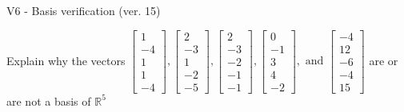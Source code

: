 \begin{exercise}
  \begin{exerciseTitle}V6 - Basis verification (ver. 15)\end{exerciseTitle}
  \begin{exerciseStatement}
    Explain why the vectors \(\left[\begin{array}{r}
1 \\
-4 \\
1 \\
1 \\
-4
\end{array}\right] , \left[\begin{array}{r}
2 \\
-3 \\
1 \\
-2 \\
-5
\end{array}\right] , \left[\begin{array}{r}
2 \\
-3 \\
-2 \\
-1 \\
-1
\end{array}\right] , \left[\begin{array}{r}
0 \\
-1 \\
3 \\
4 \\
-2
\end{array}\right] , \text{ and } \left[\begin{array}{r}
-4 \\
12 \\
-6 \\
-4 \\
15
\end{array}\right]\) are or are not a basis of \(\mathbb{R}^5\)	



\end{exerciseStatement}
\end{exercise}
